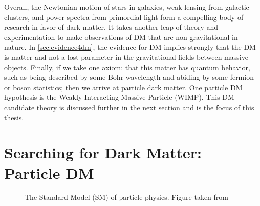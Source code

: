 Overall, the Newtonian motion of stars in galaxies, weak lensing from galactic clusters, and power spectra from primordial light form a compelling body of research in favor of dark matter.
It takes another leap of theory and experimentation to make observations of DM that are non-gravitational in nature.
In \cref{sec:evidence4dm}, the evidence for DM implies strongly that the DM is matter and not a lost parameter in the gravitational fields between massive objects.
Finally, if we take one axiom: that this matter has quantum behavior, such as being described by some Bohr wavelength and abiding by some fermion or boson statistics; then we arrive at particle dark matter.
One particle DM hypothesis is the Weakly Interacting Massive Particle (WIMP).
This DM candidate theory is discussed further in the next section and is the focus of this thesis.

\section{Searching for Dark Matter: Particle DM}\label{sec:dm_search}

\begin{figure}[h]
    \caption{The Standard Model (SM) of particle physics. Figure taken from \cite{sm_table}}
    \label{fig:SM}
\end{figure}

